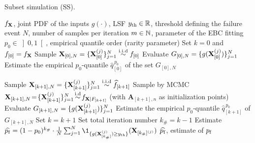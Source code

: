 \begin{algorithm}[h]
    \caption{Subset simulation (SS).}\label{alg:ss}
    \footnotesize
    \begin{algorithmic}
        \State $f_{\bf X}$, joint PDF of the inputs
        \State $g(\cdot)$, LSF
        \State $y_\mathrm{th} \in \mathbb{R}$, threshold defining the failure event 
        \State $N$, number of samples per iteration
        \State $m \in \mathbb{N}$, parameter of the EBC fitting
        \State $p_0 \in \left]0, 1\right[$, empirical quantile order (rarity parameter)
        \State Set $k = 0$ and $f_{[0]} = f_{\bf X}$
        \State Sample ${\bf X}_{[0], N} = \{{\bf X}_{[0]}^{(j)}\}_{j=1}^N \overset{\text{i.i.d}}{\sim} f_{[0]}$
        \State Evaluate $G_{[0], N} = \{g({\bf X}_{[0]}^{(j)})\}_{j=1}^N$
        \State Estimate the empirical $p_0$-quantile $\widehat{q}_{[0]}^{\, p_0}$ of the set $G_{[0], N}$
        
        \State Sample ${\bf X}_{[k+1], N} = \{{\bf X}_{[k+1]}^{(j)}\}_{j=1}^N \overset{\text{i.i.d}}{\sim} \widehat{f}_{[k+1]}$
        \State Sample by MCMC ${\bf X}_{[k+1], N} \!=\! \{{\bf X}_{[k+1]}^{(j)}\}_{j=1}^N \!\overset{\text{i.d}}{\sim}\! f_{{\bf X} | F_{[k+1]}}$ (with $\mathbf{A}_{[k+1], n}$ as initialization points)
        \State Evaluate $G_{[k+1], N} = \{g({\bf X}_{[k+1]}^{(j)})\}_{j=1}^N$
        \State Estimate the empirical $p_0$-quantile $\widehat{q}_{[k+1]}^{\, p_0}$ of $G_{[k+1], N}$
        \State Set $k = k+1$
        \EndWhile
        \State Set total iteration number $k_\# = k-1$ 
        \State Estimate $\widehat{\pf} = (1 - p_0)^{k_\#} \cdot \frac{1}{N} \sum_{j=1}^N \1_{\{g(\bX_{[k_\#]}^{(j)}) \geq \yth  \}}(\bX_{[k_\#]^{(j)}}) $
        \State $\widehat{p_\mathrm{f}}$, estimate of $p_\mathrm{f}$
    \end{algorithmic}
    \end{algorithm}












